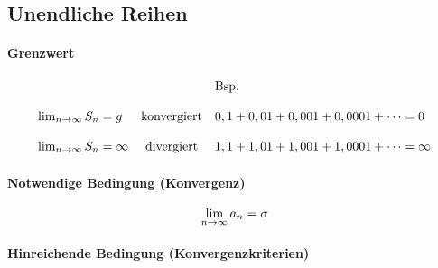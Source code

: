 \subsection{Unendliche Reihen}

\paragraph{Grenzwert}

\[
	\begin{array}{lcl}
		                            &                    & \text{Bsp.}                                   \\
		\\
		\lim_{n \rightarrow{} \infty} S_n = g      & \text{konvergiert} & 0,1 + 0,01 + 0,001 + 0,0001 + \cdots = 0      \\
		\\
		\lim_{n \rightarrow{} \infty} S_n = \infty & \text{divergiert}  & 1,1 + 1,01 + 1,001 + 1,0001 + \cdots = \infty
	\end{array}
\]

\paragraph{Notwendige Bedingung (Konvergenz)}

\[
	\lim_{n \rightarrow{} \infty} a_n = \sigma
\]

\paragraph{Hinreichende Bedingung (Konvergenzkriterien)}




